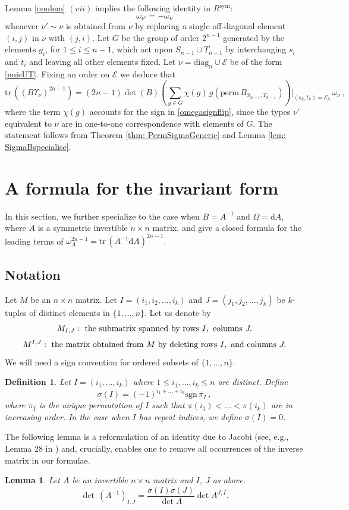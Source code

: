 \documentclass[10pt]{amsart}
\newcommand{\dd}{\mathrm{d}}
\newcommand{\sE}{\mathcal{E}}
\newcommand{\tr}{\mathrm{tr}\,}
\newcommand{\diag}{\mathrm{diag}}
\newcommand{\perm}{\mathrm{perm}\,}
\newcommand{\sgn}{\mathrm{sgn}\,}
\newcommand{\sym}{\mathrm{sym}}
\theoremstyle{plain}
\newtheorem{lem}[thm]{Lemma}
\newtheorem{defn}[thm]{Definition}
\newcommand{\0}{\color{blue}{\mathsf{0}}}
\begin{document}
Lemma \ref{onulem} $(vii)$ implies  the following identity   in $R^{\sym}$:  
\begin{equation}  \label{omegasignflip} \omega_{\nu'} = -  \omega_{\nu}\end{equation}
whenever $\nu'\sim \nu$ is obtained from $\nu$ by replacing a single off-diagonal element $(i,j)$ in $\nu$ with $(j,i)$.
Let $G$ be the group of order $2^{n-1}$ generated by the elements $g_i$, for $1\leq i\leq n-1$, which act upon $S_{n-1} \cup T_{n-1}$ by interchanging $s_i$ and $t_i$ and leaving all other elements fixed.  Let $\nu= \diag_n \cup \sE$ be of the form \eqref{nuisUT}.
Fixing an order on $\sE$ we deduce that
\[ \tr \left((B\Upsilon_{\nu})^{2n-1}\right) = (2n-1) \det(B) \left( \sum_{ g \in G }   \chi(g) \, g (  \perm B_{S_{n-1},T_{n-1}})\right)\Bigg|_{(s_k,t_k)=\sE_k}  \,    \omega_{\nu} \ , \]
where the term $\chi(g)$ accounts for the sign in \eqref{omegasignflip}, since the types $\nu'$ equivalent to $\nu$ are in one-to-one correspondence with elements of $G$. 
The statement   follows from Theorem \ref{thm: PermSigmaGeneric} and Lemma \ref{lem: SigmaBspecialise}. 

\section{A formula for the invariant form}\label{sectformulaA}
In this section, we  further specialize to the case when  $B=A^{-1}$ and $\Omega=\dd A$, where $A$ is a symmetric invertible $n \times n$ matrix,
and give a closed formula for  the leading terms of $\omega_A^{2n-1}=\tr(A^{-1}\dd A)^{2n-1} $.

\subsection{Notation}
Let $M$ be an $n\times n$ matrix.  
Let $I=(i_1,i_2, \ldots, i_k)$ and $J=(j_1, j_2, \ldots, j_k)$ be $k$-tuples of distinct elements in $\{1,\ldots, n\}$.  
Let us denote by 
$$M_{I,J} : \hbox{ the submatrix spanned by rows } I , \hbox{ columns } J.$$
$$ M^{I,J} : \hbox{ the matrix obtained from $M$ by deleting  rows } I , \hbox{  and columns } J.$$
We will need a sign convention for ordered subsets of $\{1,\ldots, n\}$. 
\begin{defn}\label{defsign}
Let $I= (i_1,\ldots, i_k)$ where $1\leq i_1,\ldots, i_k \leq n$ are distinct.
Define 
$$
\sigma(I)=(-1)^{i_1+ \ldots + i_k} \sgn \pi_I\ ,
$$
where $\pi_I$ is the unique permutation of $I$ such that $\pi(i_1)<  \ldots < \pi(i_k)$ are in increasing order.  In the case when $I$ has repeat indices, we define $\sigma(I)=0$.
\end{defn}
The following lemma is a reformulation of an  identity due to Jacobi (see, e.g., Lemma 28  in \cite{PeriodsFeynman}) and, crucially, enables one to remove all occurrences of the inverse matrix in our formulae. 
\begin{lem}\label{detlem}
Let $A$ be an invertible $n\times n$ matrix and $I$, $J$ as above. 
\begin{equation}\label{deteqgen}
\det\,(A^{-1})_{I,J}=\frac{\sigma(I)\sigma(J)}{\det A}\det A^{J,I}.
\end{equation}
\end{lem}
\end{document}
